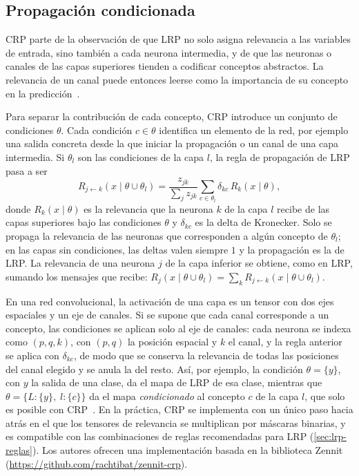 \subsection{Propagación condicionada}\label{sec:crp-condicionada}

CRP parte de la observación de que LRP no solo asigna relevancia a las variables de
entrada, sino también a cada neurona intermedia, y de que las neuronas o canales de
las capas superiores tienden a codificar conceptos abstractos. La relevancia de un
canal puede entonces leerse como la importancia de su concepto en la
predicción~\cite{achtibat2023}.

Para separar la contribución de cada concepto, CRP introduce un conjunto de
condiciones $\theta$. Cada condición $c \in \theta$ identifica un elemento de la red,
por ejemplo una salida concreta desde la que iniciar la propagación o un canal de una
capa intermedia. Si $\theta_l$ son las condiciones de la capa $l$, la regla de
propagación de LRP pasa a ser
\begin{equation}\label{eq:crp-regla}
  R_{j\leftarrow k}(x \mid \theta \cup \theta_l)
  = \frac{z_{jk}}{\sum_{j} z_{jk}} \sum_{c \in \theta_l} \delta_{kc}\, R_k(x \mid \theta),
\end{equation}
donde $R_k(x \mid \theta)$ es la relevancia que la neurona $k$ de la capa $l$ recibe
de las capas superiores bajo las condiciones $\theta$ y $\delta_{kc}$ es la delta de
Kronecker. Solo se propaga la relevancia de las neuronas que corresponden a algún
concepto de $\theta_l$; en las capas sin condiciones, las deltas valen siempre $1$ y
la propagación es la de LRP. La relevancia de una neurona $j$ de la capa inferior se
obtiene, como en LRP, sumando los mensajes que recibe:
$R_j(x \mid \theta \cup \theta_l) = \sum_k R_{j\leftarrow k}(x \mid \theta \cup \theta_l)$.

En una red convolucional, la activación de una capa es un tensor con dos ejes
espaciales y un eje de canales. Si se supone que cada canal corresponde a un
concepto, las condiciones se aplican solo al eje de canales: cada neurona se indexa
como $(p,q,k)$, con $(p,q)$ la posición espacial y $k$ el canal, y la regla
anterior se aplica con $\delta_{kc}$, de modo que se conserva la relevancia
de todas las posiciones del canal elegido y se anula la del resto. Así, por ejemplo,
la condición $\theta = \{y\}$, con $y$ la salida de una clase, da el mapa de LRP de
esa clase, mientras que $\theta = \{L\colon \{y\},\; l\colon \{c\}\}$ da el mapa
\emph{condicionado} al concepto $c$ de la capa $l$, que solo es posible con
CRP~\cite{achtibat2023}. En la práctica, CRP se implementa con un único paso hacia
atrás en el que los tensores de relevancia se multiplican por máscaras binarias, y es
compatible con las combinaciones de reglas recomendadas para LRP
(\cref{sec:lrp-reglas}). Los autores ofrecen una implementación basada en la
biblioteca Zennit (\url{https://github.com/rachtibat/zennit-crp}).

